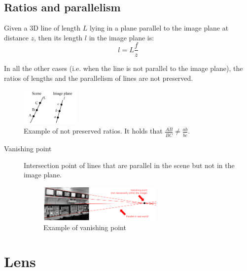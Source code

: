 \subsection{Ratios and parallelism}

Given a 3D line of length $L$ lying in a plane parallel to the image plane at distance $z$,
then its length $l$ in the image plane is:
\[ l = L\frac{f}{z} \]

In all the other cases (i.e. when the line is not parallel to the image plane), 
the ratios of lengths and the parallelism of lines are not preserved.

\begin{figure}[h]
    \centering
    \includegraphics[width=0.25\textwidth]{./img/_perspective_projection_ratio.pdf}
    \caption{Example of not preserved ratios. It holds that $\frac{\overline{AB}}{\overline{BC}} \neq \frac{\overline{ab}}{\overline{bc}}$.}
\end{figure}

\begin{description}
    \item[Vanishing point] 
        Intersection point of lines that are parallel in the scene but not in the image plane.

        \begin{figure}[h]
            \centering
            \includegraphics[width=0.6\textwidth]{./img/_vanishing_point.pdf}
            \caption{Example of vanishing point}
        \end{figure}
\end{description}



\section{Lens}

